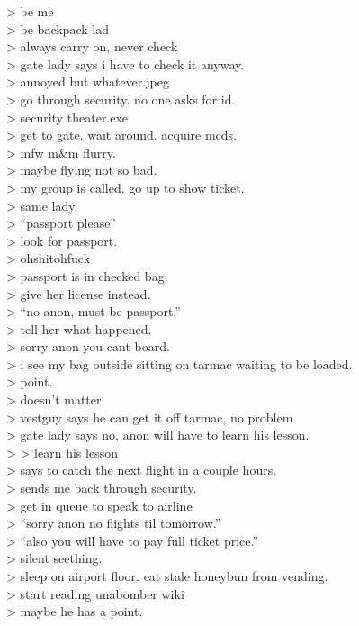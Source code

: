 \textgreater{} be me \\
\textgreater{} be backpack lad \\
\textgreater{} always carry on, never check \\
\textgreater{} gate lady says i have to check it anyway.  \\
\textgreater{} annoyed but whatever.jpeg \\
\textgreater{} go through security. no one asks for id.  \\
\textgreater{} security theater.exe \\
\textgreater{} get to gate. wait around. acquire mcds. \\
\textgreater{} mfw m\&m flurry. \\
\textgreater{} maybe flying not so bad. \\
\textgreater{} my group is called. go up to show ticket. \\
\textgreater{} same lady. \\
\textgreater{} ``passport please'' \\
\textgreater{} look for passport.  \\
\textgreater{} ohshitohfuck \\
\textgreater{} passport is in checked bag. \\
\textgreater{} give her license instead. \\
\textgreater{} ``no anon, must be passport.'' \\
\textgreater{} tell her what happened. \\
\textgreater{} sorry anon you cant board.  \\
\textgreater{} i see my bag outside sitting on tarmac waiting to be loaded. \\
\textgreater{} point. \\
\textgreater{} doesn't matter \\
\textgreater{} vestguy says he can get it off tarmac, no problem \\
\textgreater{} gate lady says no, anon will have to learn his lesson. \\
\textgreater{} \textgreater{} learn his lesson \\
\textgreater{} says to catch the next flight in a couple hours. \\
\textgreater{} sends me back through security.   \\
\textgreater{} get in queue to speak to airline \\
\textgreater{} ``sorry anon no flights til tomorrow.'' \\
\textgreater{} ``also you will have to pay full ticket price.'' \\
\textgreater{} silent seething. \\
\textgreater{} sleep on airport floor. eat stale honeybun from vending.  \\
\textgreater{} start reading unabomber wiki \\
\textgreater{} maybe he has a point.